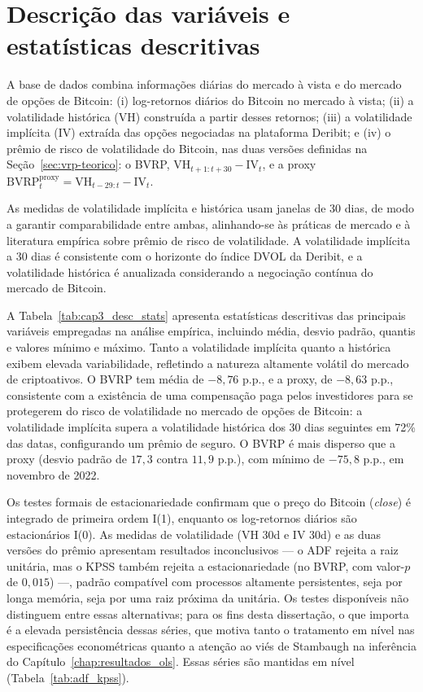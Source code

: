 \section{Descrição das variáveis e estatísticas descritivas}
\label{sec:estatisticas_descritivas}

A base de dados combina informações diárias do mercado à vista e do mercado de
opções de Bitcoin: (i) log-retornos diários do Bitcoin no mercado à vista;
(ii) a volatilidade histórica (VH) construída a partir desses retornos;
(iii) a volatilidade implícita (IV) extraída das opções negociadas na
plataforma Deribit; e (iv) o prêmio de risco de volatilidade do Bitcoin, nas
duas versões definidas na Seção~\ref{sec:vrp-teorico}: o BVRP,
$\text{VH}_{t+1:t+30} - \text{IV}_t$, e a proxy
$\text{BVRP}^{\text{proxy}}_t = \text{VH}_{t-29:t} - \text{IV}_t$.

As medidas de volatilidade implícita e histórica usam janelas de 30 dias, de
modo a garantir comparabilidade entre ambas, alinhando-se às práticas de
mercado e à literatura empírica sobre prêmio de risco de volatilidade. A
volatilidade implícita a 30 dias é consistente com o horizonte do índice DVOL
da Deribit, e a volatilidade histórica é anualizada considerando a negociação
contínua do mercado de Bitcoin.

A Tabela~\ref{tab:cap3_desc_stats} apresenta estatísticas descritivas das
principais variáveis empregadas na análise empírica, incluindo média, desvio
padrão, quantis e valores mínimo e máximo. Tanto a volatilidade implícita
quanto a histórica exibem elevada variabilidade, refletindo a natureza
altamente volátil do mercado de criptoativos. O BVRP tem média de
$-8{,}76$ p.p., e a proxy, de $-8{,}63$ p.p., consistente com a existência de
uma compensação paga pelos investidores para se protegerem do risco de
volatilidade no mercado de opções de Bitcoin: a volatilidade implícita supera
a volatilidade histórica dos 30 dias seguintes em 72\% das datas, configurando
um prêmio de seguro. O BVRP é mais disperso que a proxy (desvio padrão de
$17{,}3$ contra $11{,}9$ p.p.), com mínimo de $-75{,}8$ p.p., em novembro de
2022.

Os testes formais de estacionariedade confirmam que o preço do Bitcoin (\textit{close}) é integrado de primeira ordem I(1), enquanto os log-retornos diários são estacionários I(0). As medidas de volatilidade (VH 30d e IV 30d) e as duas versões do prêmio apresentam resultados inconclusivos --- o ADF rejeita a raiz unitária, mas o KPSS também rejeita a estacionariedade (no BVRP, com valor-$p$ de $0{,}015$) ---, padrão compatível com processos altamente persistentes, seja por longa memória, seja por uma raiz próxima da unitária. Os testes disponíveis não distinguem entre essas alternativas; para os fins desta dissertação, o que importa é a elevada persistência dessas séries, que motiva tanto o tratamento em nível nas especificações econométricas quanto a atenção ao viés de Stambaugh na inferência do Capítulo~\ref{chap:resultados_ols}. Essas séries são mantidas em nível (Tabela~\ref{tab:adf_kpss}).

